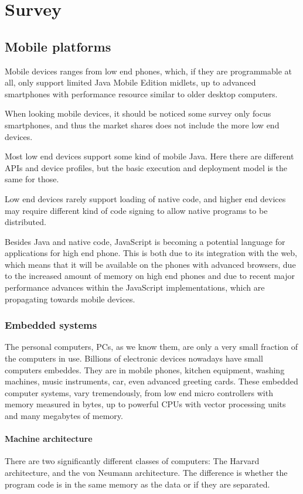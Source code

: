 \documentclass[11pt]{report}
\begin{document}
\chapter{Survey}
\label{survey}

\section{Mobile platforms}

Mobile devices ranges from low end phones, which, if they are programmable at all, only support limited Java Mobile Edition midlets, up to advanced smartphones with performance resource similar to older desktop computers.

When looking mobile devices, it should be noticed some survey \cite{smartphonesurvey} only focus smartphones, and thus the market shares does not include the more low end devices.

Most low end devices support some kind of mobile Java.
Here there are different APIs and device profiles, but the basic execution and deployment model is the same for those.

Low end devices rarely support loading of native code, and higher end devices may require different kind of code signing to allow native programs to be distributed.

Besides Java and native code, JavaScript is becoming a potential language for applications for high end phone. 
This is both due to its integration with the web, which means that it will be available on the phones with advanced browsers, due to the increased amount of memory on high end phones
and due to recent major performance advances within the JavaScript implementations, which are propagating towards mobile devices.

\subsection{Embedded systems}
The personal computers, PCs, as we know them, are only a very small fraction of the computers in use.
Billions of electronic devices nowadays have small computers embeddes. They are in mobile phones, kitchen equipment, washing machines, music instruments, car, even advanced greeting cards. 
These embedded computer systems, vary tremendously, from low end micro controllers with memory measured in bytes, up to powerful CPUs with vector processing units and many megabytes of memory.

\subsubsection{Machine architecture}
There are two significantly different classes of computers: The Harvard architecture, and the von Neumann architecture. The difference is whether the program code is in the same memory as the data or if they are separated.
\end{document}
